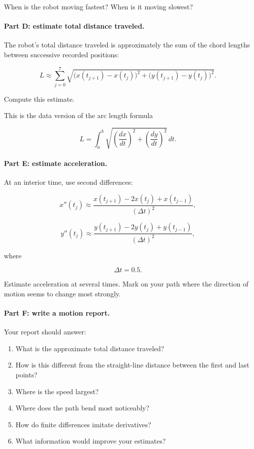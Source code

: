 When is the robot moving fastest?  When is it moving slowest?

\paragraph{Part D: estimate total distance traveled.}
The robot's total distance traveled is approximately the sum of the chord lengths between
successive recorded positions:

\[
\boxed{
L
\approx
\sum_{j=0}^{7}
\sqrt{
\bigl(x(t_{j+1})-x(t_j)\bigr)^2
+
\bigl(y(t_{j+1})-y(t_j)\bigr)^2
}.
}
\]

Compute this estimate.

This is the data version of the arc length formula

\[
L=\int_a^b
\sqrt{
\left(\frac{dx}{dt}\right)^2
+
\left(\frac{dy}{dt}\right)^2
}
\,dt.
\]

\paragraph{Part E: estimate acceleration.}
At an interior time, use second differences:

\[
\boxed{
x''(t_j)
\approx
\frac{x(t_{j+1})-2x(t_j)+x(t_{j-1})}{(\Delta t)^2},
}
\]

\[
\boxed{
y''(t_j)
\approx
\frac{y(t_{j+1})-2y(t_j)+y(t_{j-1})}{(\Delta t)^2},
}
\]

where

\[
\Delta t=0.5.
\]

Estimate acceleration at several times.  Mark on your path where the direction of motion
seems to change most strongly.

\paragraph{Part F: write a motion report.}
Your report should answer:

\begin{enumerate}
\item What is the approximate total distance traveled?

\item How is this different from the straight-line distance between the first and last
points?

\item Where is the speed largest?

\item Where does the path bend most noticeably?

\item How do finite differences imitate derivatives?

\item What information would improve your estimates?
\end{enumerate}

